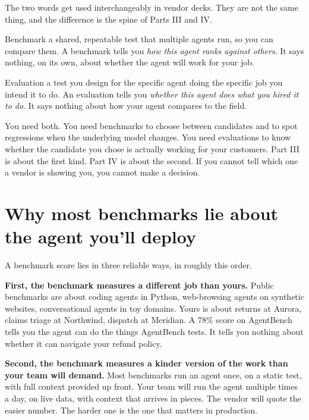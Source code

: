 The two words get used interchangeably in vendor decks. They are not the same thing, and the difference is the spine of Parts III and IV.

\begin{TNdefinition}{Benchmark} a shared, repeatable test that multiple agents run, so you can compare them. A benchmark tells you \textit{how this agent ranks against others}. It says nothing, on its own, about whether the agent will work for your job. \end{TNdefinition}

\begin{TNdefinition}{Evaluation} a test you design for the specific agent doing the specific job you intend it to do. An evaluation tells you \textit{whether this agent does what you hired it to do}. It says nothing about how your agent compares to the field. \end{TNdefinition}

You need both. You need benchmarks to choose between candidates and to spot regressions when the underlying model changes. You need evaluations to know whether the candidate you chose is actually working for your customers. Part III is about the first kind. Part IV is about the second. If you cannot tell which one a vendor is showing you, you cannot make a decision.

\section{Why most benchmarks lie about the agent you'll deploy}

A benchmark score lies in three reliable ways, in roughly this order.

\textbf{First, the benchmark measures a different job than yours.} Public benchmarks are about coding agents in Python, web-browsing agents on synthetic websites, conversational agents in toy domains. Yours is about returns at Aurora, claims triage at Northwind, dispatch at Meridian. A 78\% score on AgentBench tells you the agent can do the things AgentBench tests. It tells you nothing about whether it can navigate your refund policy.

\textbf{Second, the benchmark measures a kinder version of the work than your team will demand.} Most benchmarks run an agent once, on a static test, with full context provided up front. Your team will run the agent multiple times a day, on live data, with context that arrives in pieces. The vendor will quote the easier number. The harder one is the one that matters in production.

